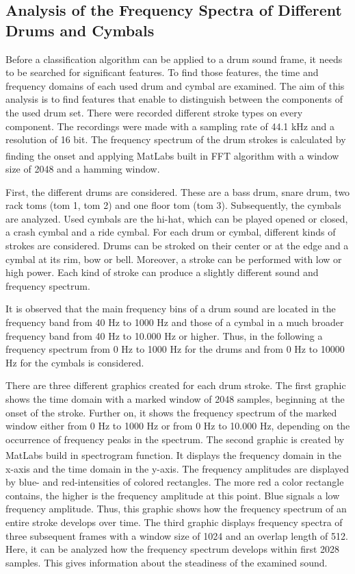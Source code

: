 \subsection{Analysis of the Frequency Spectra of Different Drums and Cymbals} 
\label{section:classificationSpectrumAnalysis}

Before a classification algorithm can be applied to a drum sound frame, it needs to be searched for significant features. To find those features, the time and frequency domains of each used drum and cymbal are examined. The aim of this analysis is to find features that enable to distinguish between the components of the used drum set. There were recorded different stroke types on every component.  The recordings were made with a sampling rate of 44.1 kHz and a resolution of 16 bit. The frequency spectrum of the drum strokes is calculated by finding the onset and applying MatLab\textsuperscript{\textregistered}s built in FFT algorithm with a window size of 2048 and a hamming window.

First, the different drums are considered. These are a bass drum, snare drum, two rack toms (tom 1, tom 2) and one floor tom (tom 3). Subsequently, the cymbals are analyzed. Used cymbals are the hi-hat, which can be played opened or closed, a crash cymbal and a ride cymbal. For each drum or cymbal, different kinds of strokes are considered. Drums can be stroked on their center or at the edge and a cymbal at its rim, bow or bell. Moreover, a stroke can be performed with low or high power. Each kind of stroke can produce a slightly different sound and frequency spectrum.

It is observed that the main frequency bins of a drum sound are located in the frequency band from 40 Hz to 1000 Hz and those of a cymbal in a much broader frequency band from 40 Hz to 10.000 Hz or higher. Thus, in the following a frequency spectrum from 0 Hz to 1000 Hz for the drums and from 0 Hz to 10000 Hz for the cymbals is considered.

There are three different graphics created for each drum stroke. The first graphic shows the time domain with a marked window of 2048 samples, beginning at the onset of the stroke. Further on, it shows the frequency spectrum of the marked window either from 0 Hz to 1000 Hz or from 0 Hz to 10.000 Hz, depending on the occurrence of frequency peaks in the spectrum. The second graphic is created by MatLab\textsuperscript{\textregistered}s build in spectrogram function. It displays the frequency domain in the x-axis and the time domain in the y-axis. The frequency amplitudes are displayed by blue- and red-intensities of colored rectangles. The more red a color rectangle contains, the higher is the frequency amplitude at this point. Blue signals a low frequency amplitude. Thus, this graphic shows how the frequency spectrum of an entire stroke develops over time. The third graphic displays frequency spectra of three subsequent frames with a window size of 1024 and an overlap length of 512. Here, it can be analyzed how the frequency spectrum develops within first 2028 samples. This gives information about the steadiness of the examined sound.


